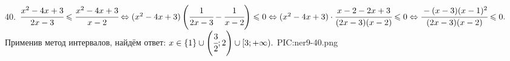 40. $\cfrac{x^2-4x+3}{2x-3}\leqslant\cfrac{x^2-4x+3}{x-2}\Leftrightarrow (x^2-4x+3)\left(\cfrac{1}{2x-3}-\cfrac{1}{x-2}\right)\leqslant0
\Leftrightarrow (x^2-4x+3)\cdot\cfrac{x-2-2x+3}{(2x-3)(x-2)}\leqslant0\Leftrightarrow\cfrac{-(x-3)(x-1)^2}{(2x-3)(x-2)}\leqslant0.$ Применив метод интервалов, найдём ответ: $x\in\{1\}\cup\left(\cfrac{3}{2};2\right)\cup[3;+\infty).$
{{PIC:ner9-40.png}}\newpage\noindent
